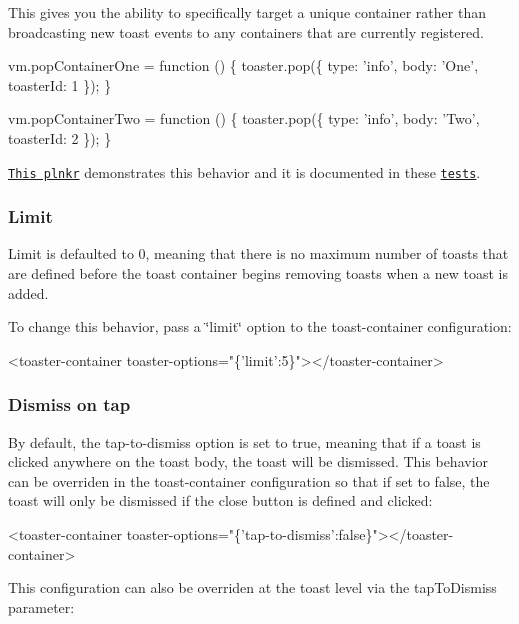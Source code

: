 This gives you the ability to specifically target a unique container rather than broadcasting new toast events to any containers that are currently registered.


\begin{DoxyCode}
vm.popContainerOne = function () \{
    toaster.pop(\{ type: 'info', body: 'One', toasterId: 1 \});
\}

vm.popContainerTwo = function () \{
    toaster.pop(\{ type: 'info', body: 'Two', toasterId: 2 \});
\}
\end{DoxyCode}


\href{http://plnkr.co/edit/4ICtcrpTSoAB9Vo5bRvN?p=preview}{\tt This plnkr} demonstrates this behavior and it is documented in these \href{test/toasterContainerSpec.js#L430}{\tt tests}.

\subsubsection*{Limit}

Limit is defaulted to 0, meaning that there is no maximum number of toasts that are defined before the toast container begins removing toasts when a new toast is added.

To change this behavior, pass a \char`\"{}limit\char`\"{} option to the toast-\/container configuration\+:


\begin{DoxyCode}
<toaster-container toaster-options="\{'limit':5\}"></toaster-container>
\end{DoxyCode}


\subsubsection*{Dismiss on tap}

By default, the {\ttfamily tap-\/to-\/dismiss} option is set to true, meaning that if a toast is clicked anywhere on the toast body, the toast will be dismissed. This behavior can be overriden in the toast-\/container configuration so that if set to false, the toast will only be dismissed if the close button is defined and clicked\+:


\begin{DoxyCode}
<toaster-container toaster-options="\{'tap-to-dismiss':false\}"></toaster-container>
\end{DoxyCode}


This configuration can also be overriden at the toast level via the {\ttfamily tap\+To\+Dismiss} parameter\+:


